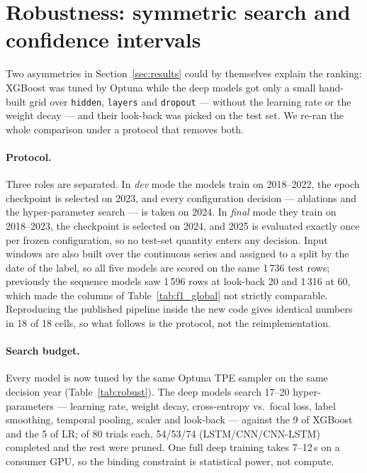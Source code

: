 \documentclass[runningheads]{llncs}
\begin{document}
\section{Robustness: symmetric search and confidence intervals}
\label{sec:robust}

Two asymmetries in Section~\ref{sec:results} could by themselves explain the ranking: XGBoost was tuned by Optuna while the deep models got only a small hand-built grid over \texttt{hidden}, \texttt{layers} and \texttt{dropout} --- without the learning rate or the weight decay --- and their look-back was picked on the test set. We re-ran the whole comparison under a protocol that removes both.

\paragraph{Protocol.}
Three roles are separated. In \emph{dev} mode the models train on 2018--2022, the
epoch checkpoint is selected on 2023, and every configuration decision --- ablations
and the hyper-parameter search --- is taken on 2024. In \emph{final} mode they train
on 2018--2023, the checkpoint is selected on 2024, and 2025 is evaluated exactly
once per frozen configuration, so no test-set quantity enters any decision. Input
windows are also built over the continuous series and assigned to a split by the
date of the label, so all five models are scored on the same 1\,736 test rows;
previously the sequence models saw 1\,596 rows at look-back 20 and 1\,316 at 60,
which made the columns of Table~\ref{tab:f1_global} not strictly comparable.
Reproducing the published pipeline inside the new code gives identical numbers in
18 of 18 cells, so what follows is the protocol, not the reimplementation.

\paragraph{Search budget.}
Every model is now tuned by the same Optuna TPE sampler on the same decision year (Table~\ref{tab:robust}). The deep models search 17--20 hyper-parameters --- learning rate, weight decay, cross-entropy vs.\ focal loss, label smoothing, temporal pooling, scaler and look-back --- against the 9 of XGBoost and the 5 of LR; of 80 trials each, 54/53/74 (LSTM/CNN/CNN-LSTM) completed and the rest were pruned. One full deep training takes 7--12\,s on a consumer GPU, so the binding constraint is statistical power, not compute.
\end{document}
